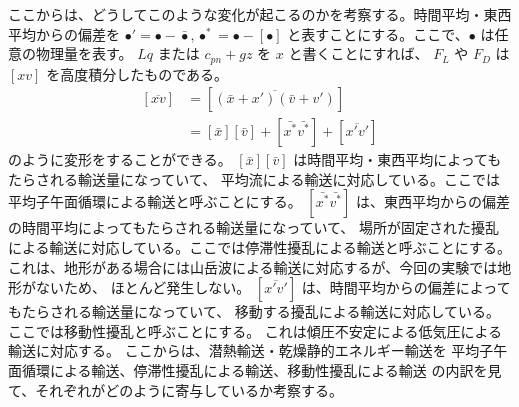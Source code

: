 \documentclass[body]{subfiles}
\begin{document}
ここからは、どうしてこのような変化が起こるのかを考察する。時間平均・東西平均からの偏差を
\(\bullet'=\bullet-\bar\bullet, \bullet^*=\bullet-[\bullet]\)
と表すことにする。ここで、\(\bullet\) は任意の物理量を表す。
\(Lq\) または \(c_{pn}+gz\) を \(x\) と書くことにすれば、
\(F_L\) や \(F_D\) は \([xv]\) を高度積分したものである。
\begin{equation}
	\begin{split}
		[\overline{xv}]&=[\overline{(\bar x+x')(\bar v+v')}]\\
		&=[\bar x][\bar v]+[\bar{x^*}\bar{v^*}]+[\overline{x'v'}]
	\end{split}\label{keith5}
\end{equation}
のように変形をすることができる。
\([\bar x][\bar v]\) は時間平均・東西平均によってもたらされる輸送量になっていて、
平均流による輸送に対応している。ここでは平均子午面循環による輸送と呼ぶことにする。
\([\bar{x^*}\bar{v^*}]\) は、東西平均からの偏差の時間平均によってもたらされる輸送量になっていて、
場所が固定された擾乱による輸送に対応している。ここでは停滞性擾乱による輸送と呼ぶことにする。
これは、地形がある場合には山岳波による輸送に対応するが、今回の実験では地形がないため、
ほとんど発生しない。
\([\overline{x'v'}]\) は、時間平均からの偏差によってもたらされる輸送量になっていて、
移動する擾乱による輸送に対応している。ここでは移動性擾乱と呼ぶことにする。
これは傾圧不安定による低気圧による輸送に対応する。
ここからは、潜熱輸送・乾燥静的エネルギー輸送を
平均子午面循環による輸送、停滞性擾乱による輸送、移動性擾乱による輸送
の内訳を見て、それぞれがどのように寄与しているか考察する。
\end{document}

